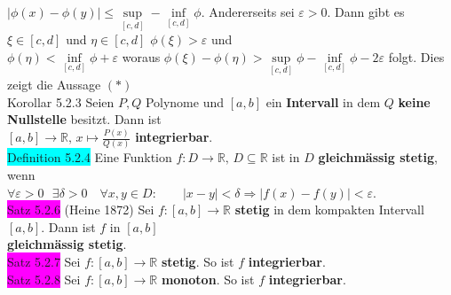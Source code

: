 \documentclass[10pt]{article}
\begin{document}
        \indent \textcolor{NavyBlue}{
                $|\phi(x)-\phi(y)|\leqslant\sup\limits_{[c,d]}-\inf\limits_{[c,d]}\phi$}. 
                Andererseits sei \textcolor{NavyBlue}{$\varepsilon>0$}. 
                Dann gibt es \textcolor{NavyBlue}{$\xi\in[c,d]$}
                und \textcolor{NavyBlue}{$\eta\in[c,d]$ $\phi(\xi)>\varepsilon$} und \\
        \indent \textcolor{NavyBlue}{$\phi(\eta)<\inf\limits_{[c,d]}\phi+\varepsilon$} 
                woraus 
                \textcolor{NavyBlue}{$\phi(\xi)-\phi(\eta)
                >\sup\limits_{[c,d]}\phi-\inf\limits_{[c,d]}\phi-2\varepsilon$}
                folgt. Dies zeigt die Aussage $(*)$ \\
\colorbox{BurntOrange}{Korollar 5.2.3} Seien \textcolor{NavyBlue}{$P,Q$} Polynome und 
                \textcolor{NavyBlue}{$[a,b]$}
                ein \textbf{Intervall} in dem \textcolor{NavyBlue}{$Q$} 
                \textbf{keine Nullstelle} besitzt. Dann ist \\
        \indent \textcolor{NavyBlue}{
                $[a,b]\longrightarrow\mathbb{R},\,x\mapsto\frac{P(x)}{Q(x)}$}
                \textbf{integrierbar}.\\
\colorbox{cyan}{Definition 5.2.4} Eine Funktion 
                \textcolor{NavyBlue}{$f:D\longrightarrow\mathbb{R},\,D\subseteq\mathbb{R}$}
                ist in \textcolor{NavyBlue}{$D$} \textbf{gleichmässig stetig}, wenn \\
        \indent \textcolor{NavyBlue}{
                $\forall\varepsilon>0\,\enspace\exists\delta>0\quad\forall x,y\in D:\qquad
                |x-y|<\delta\Longrightarrow|f(x)-f(y)|<\varepsilon$}.\\
\colorbox{magenta}{Satz 5.2.6} (Heine 1872) Sei 
                \textcolor{NavyBlue}{$f:[a,b]\longrightarrow\mathbb{R}$}
                \textbf{stetig} in dem kompakten Intervall \textcolor{NavyBlue}{$[a,b]$}. 
                Dann ist \textcolor{NavyBlue}{$f$} in \textcolor{NavyBlue}{$[a,b]$}\\
        \indent \textbf{gleichmässig stetig}.\\
\colorbox{magenta}{Satz 5.2.7} Sei \textcolor{NavyBlue}{$f:[a,b]\longrightarrow\mathbb{R}$} 
                \textbf{stetig}. So ist \textcolor{NavyBlue}{$f$} \textbf{integrierbar}.\\
\colorbox{magenta}{Satz 5.2.8} Sei \textcolor{NavyBlue}{$f:[a,b]\longrightarrow\mathbb{R}$} 
                \textbf{monoton}. So ist \textcolor{NavyBlue}{$f$} \textbf{integrierbar}.\\
\end{document}
